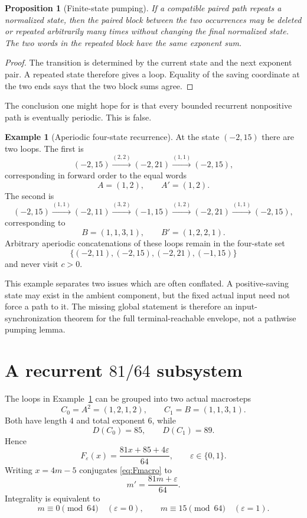 \documentclass[11pt,reqno]{amsart}
\numberwithin{equation}{section}
\newtheorem{proposition}[theorem]{Proposition}
\theoremstyle{definition}
\newtheorem{example}[theorem]{Example}
\theoremstyle{remark}
\newcommand{\eps}{\varepsilon}
\begin{document}
\begin{proposition}[Finite-state pumping]\label{prop:pumping}
If a compatible paired path repeats a normalized state, then the paired block between the two occurrences may be deleted or repeated arbitrarily many times without changing the final normalized state.  The two words in the repeated block have the same exponent sum.
\end{proposition}

\begin{proof}
The transition is determined by the current state and the next exponent pair.  A repeated state therefore gives a loop.  Equality of the saving coordinate at the two ends says that the two block sums agree.
\end{proof}

The conclusion one might hope for is that every bounded recurrent nonpositive path is eventually periodic.  This is false.

\begin{example}[Aperiodic four-state recurrence]\label{ex:fourstate}
At the state $(-2,15)$ there are two loops.  The first is
\[
 (-2,15)\xrightarrow{(2,2)}(-2,21)
 \xrightarrow{(1,1)}(-2,15),
\]
corresponding in forward order to the equal words
\[
 A=(1,2),\qquad A'=(1,2).
\]
The second is
\[
 (-2,15)\xrightarrow{(1,1)}(-2,11)
 \xrightarrow{(3,2)}(-1,15)
 \xrightarrow{(1,2)}(-2,21)
 \xrightarrow{(1,1)}(-2,15),
\]
corresponding to
\[
 B=(1,1,3,1),
 \qquad
 B'=(1,2,2,1).
\]
Arbitrary aperiodic concatenations of these loops remain in the four-state set
\[
 \{(-2,11),(-2,15),(-2,21),(-1,15)\}
\]
and never visit $c>0$.
\end{example}

This example separates two issues which are often conflated.  A positive-saving state may exist in the ambient component, but the fixed actual input need not force a path to it.  The missing global statement is therefore an input-synchronization theorem for the full terminal-reachable envelope, not a pathwise pumping lemma.

\section{A recurrent $81/64$ subsystem}\label{sec:8164}

The loops in Example~\ref{ex:fourstate} can be grouped into two actual macrosteps
\[
 C_0=A^2=(1,2,1,2),
 \qquad
 C_1=B=(1,1,3,1).
\]
Both have length $4$ and total exponent $6$, while
\[
 D(C_0)=85,
 \qquad
 D(C_1)=89.
\]
Hence
\begin{equation}\label{eq:Fmacro}
 F_\eps(x)=\frac{81x+85+4\eps}{64},
 \qquad \eps\in\{0,1\}.
\end{equation}
Writing $x=4m-5$ conjugates \eqref{eq:Fmacro} to
\begin{equation}\label{eq:mmap}
 m'=\frac{81m+\eps}{64}.
\end{equation}
Integrality is equivalent to
\begin{equation}\label{eq:residues}
 m\equiv0\pmod{64}\quad(\eps=0),
 \qquad
 m\equiv15\pmod{64}\quad(\eps=1).
\end{equation}
\end{document}
